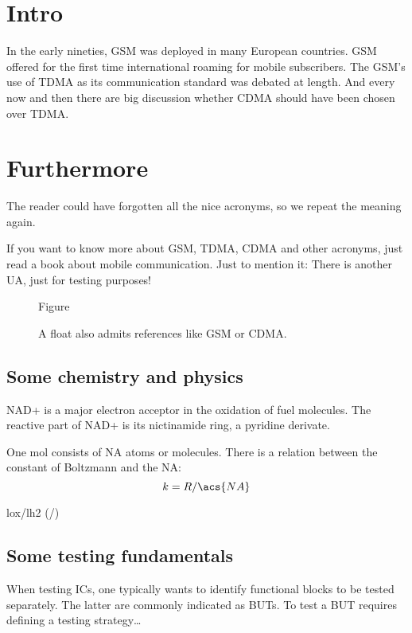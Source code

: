 \documentclass{article}
\begin{document}
\section{Intro}
In the early nineties, \acs{GSM} was deployed in many European
countries. \ac{GSM} offered for the first time international
roaming for mobile subscribers. The \acs{GSM}'s use of \ac{TDMA} as
its communication standard was debated at length. And every now
and then there are big discussion whether \ac{CDMA} should have
been chosen over \ac{TDMA}.

\section{Furthermore}
\acresetall
The reader could have forgotten all the nice acronyms, so we repeat the
meaning again.

If you want to know more about \acf{GSM}, \acf{TDMA}, \acf{CDMA}
and other acronyms, just read a book about mobile communication. Just
to mention it: There is another \ac{UA}, just for testing purposes!

\begin{figure}[h]
Figure
\caption{A float also admits references like \ac{GSM} or \acf{CDMA}.}
\end{figure}

\subsection{Some chemistry and physics}
\label{Chem}
\ac{NAD+} is a major electron acceptor in the oxidation
of fuel molecules. The reactive part of \ac{NAD+} is its nictinamide
ring, a pyridine derivate.

One mol consists of \acs{NA} atoms or molecules. There is a relation
between the constant of Boltzmann and the \acl{NA}:
\begin{equation}
  k = R/\acs{NA}
\end{equation}

\acl{lox}/\acl{lh2} (/)

\subsection{Some testing fundamentals}
When testing \acp{IC}, one typically wants to identify functional
blocks to be tested separately. The latter are commonly indicated as
\acp{BUT}. To test a \ac{BUT} requires defining a testing strategy\dots
\end{document}
